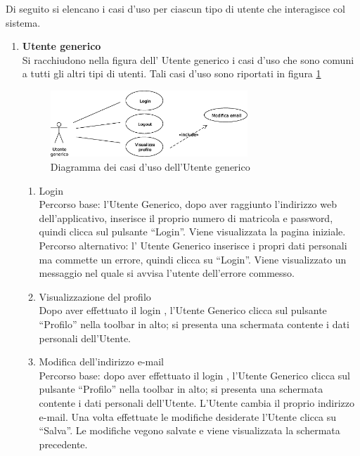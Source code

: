 Di seguito si elencano i casi d'uso per ciascun tipo di utente che interagisce col sistema. 
\begin{enumerate}

\item \textbf{Utente generico}\\
Si racchiudono nella figura dell' Utente generico i casi d'uso che sono comuni a tutti gli altri tipi di utenti. Tali casi d'uso sono riportati in figura \ref{use_case_diag_generic}

\begin{figure}[h]
  \caption{Diagramma dei casi d'uso dell'Utente generico}
  \label{use_case_diag_generic}
  \centering
    \includegraphics[width=0.7\textwidth]{images/casi_uso_utente_generico.eps}
\end{figure}

\begin{enumerate}

 \item Login\\ \label{UC_login}
    Percorso base:
    l'Utente Generico, dopo aver raggiunto l'indirizzo web dell'applicativo, inserisce il proprio numero di matricola e password, quindi clicca sul pulsante ``Login''. Viene visualizzata la pagina iniziale.\\
    Percorso alternativo:
    l' Utente Generico inserisce i propri dati personali ma commette un errore, quindi clicca su ``Login''. Viene visualizzato un messaggio nel quale si avvisa l'utente dell'errore commesso.
    
 \item Visualizzazione del profilo\\ \label{UC_view_profile}
    Dopo aver effettuato il login , l'Utente Generico clicca sul pulsante ``Profilo'' nella toolbar in alto; si presenta una schermata contente i dati personali dell'Utente.
 \item Modifica dell'indirizzo e-mail\\ \label{UC_edit_email}
  Percorso base:
  dopo aver effettuato il login , l'Utente Generico clicca sul pulsante ``Profilo'' nella toolbar in alto; si presenta una schermata contente i dati personali dell'Utente.
  L'Utente cambia il proprio indirizzo e-mail. Una volta effettuate le modifiche desiderate l'Utente clicca su ``Salva''. Le modifiche vegono salvate e viene visualizzata la schermata precedente.\\
  

\end{enumerate}
\end{enumerate}
